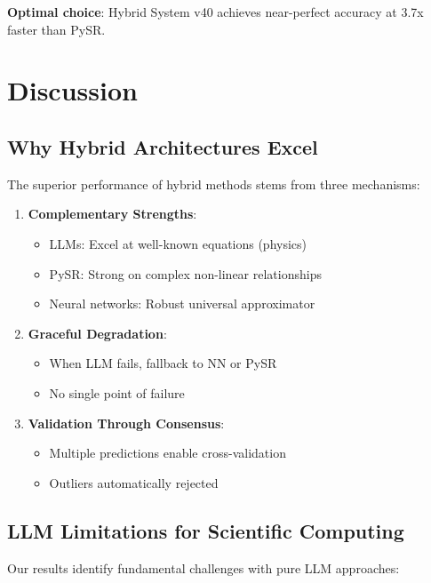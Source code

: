 \documentclass[11pt,a4paper]{article}
\begin{document}
\textbf{Optimal choice}: Hybrid System v40 achieves near-perfect accuracy at 3.7x faster than PySR.

\section{Discussion}

\subsection{Why Hybrid Architectures Excel}

The superior performance of hybrid methods stems from three mechanisms:

\begin{enumerate}
    \item \textbf{Complementary Strengths}:
    \begin{itemize}
        \item LLMs: Excel at well-known equations (physics)
        \item PySR: Strong on complex non-linear relationships
        \item Neural networks: Robust universal approximator
    \end{itemize}
    
    \item \textbf{Graceful Degradation}:
    \begin{itemize}
        \item When LLM fails, fallback to NN or PySR
        \item No single point of failure
    \end{itemize}
    
    \item \textbf{Validation Through Consensus}:
    \begin{itemize}
        \item Multiple predictions enable cross-validation
        \item Outliers automatically rejected
    \end{itemize}
\end{enumerate}

\subsection{LLM Limitations for Scientific Computing}

Our results identify fundamental challenges with pure LLM approaches:
\end{document}
